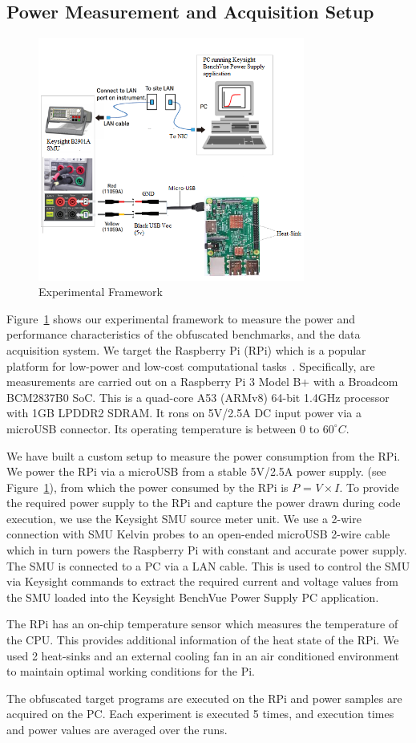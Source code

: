 \subsection{Power Measurement and Acquisition Setup}
\begin{figure}[t]
  \centering
\includegraphics[width=0.9\columnwidth, height=8cm]{expsetup}
  \caption{Experimental Framework}\label{expsetup}
\end{figure}

Figure~\ref{expsetup} shows our experimental framework to measure the power and performance characteristics of the obfuscated benchmarks, and the data acquisition system. We target the Raspberry Pi (RPi) which is a popular platform for low-power and low-cost computational tasks~\cite{maksimovic2014raspberry}. Specifically, are measurements are carried out on a Raspberry Pi 3 Model B+ with a Broadcom BCM2837B0 SoC. This is a quad-core A53 (ARMv8) 64-bit 1.4GHz processor with 1GB LPDDR2 SDRAM. It rons on 5V/2.5A DC input power via a microUSB connector. Its operating temperature is between 0 to $60^{\circ}C$.

We have built a custom setup to measure the power consumption from the RPi. We power the RPi via a microUSB from a stable 5V/2.5A power supply. (see Figure~\ref{expsetup}), from which the power consumed by the RPi is $P$ = $V\times I$.
To provide the required power supply to the RPi and capture the power drawn during code execution, we  use the Keysight SMU source meter unit. We use a 2-wire connection with SMU Kelvin probes to an open-ended microUSB 2-wire cable which in turn powers the Raspberry Pi with constant and accurate power supply. The SMU is connected to a PC via a LAN cable. This is used to control the SMU via Keysight commands to extract the required current and voltage values from the SMU loaded into the Keysight BenchVue Power Supply PC application.

The RPi has an on-chip temperature sensor which measures the temperature of the CPU. This provides additional information of the heat state of the RPi. We used 2 heat-sinks and an external cooling fan in an air conditioned environment to maintain optimal working conditions for the Pi.  

The obfuscated target programs are executed on the RPi and power samples are acquired on the PC. Each experiment is executed 5 times, and execution times and power values are averaged over the runs.